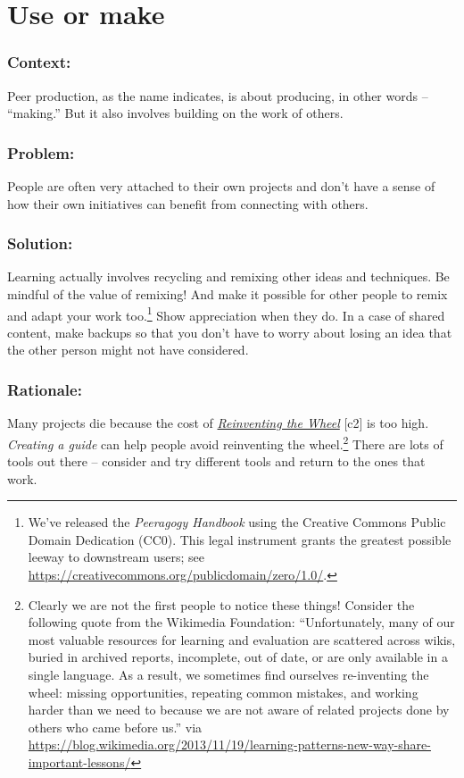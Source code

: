 \section{Use or make}
\subsubsection*{Context:}
Peer production, as the name indicates, is about producing, in other words --
``making.'' But it also involves building on the work of others.

\subsubsection*{Problem:}
People are often very attached to their own projects and don't have a sense of how their own initiatives can benefit from connecting with others.

\subsubsection*{Solution:} Learning actually involves recycling and remixing other ideas and techniques. Be mindful of the value of remixing!  And make it possible for other people to remix and adapt your work too.\footnote{We've released the \emph{Peeragogy Handbook} using the Creative Commons Public Domain Dedication (CC0).  This legal instrument grants the greatest possible leeway to downstream users; see \url{https://creativecommons.org/publicdomain/zero/1.0/}.}  Show appreciation when they do.  In a case of shared content, make backups so that you don't have to worry about losing an idea that the other person might not have considered.

\subsubsection*{Rationale:} 
Many projects die because the cost of \emph{\href{http://c2.com/cgi/wiki?ReinventingTheWheel}{Reinventing the Wheel}} [c2] is too high.  \emph{Creating a guide} can help people avoid reinventing the wheel.\footnote{Clearly we are not the first people to notice these things!  Consider the following quote from the Wikimedia Foundation: ``Unfortunately, many of our most valuable resources for learning and evaluation are scattered across wikis, buried in archived reports, incomplete, out of date, or are only available in a single language. As a result, we sometimes find ourselves re-inventing the wheel: missing opportunities, repeating common mistakes, and working harder than we need to because we are not aware of related projects done by others who came before us.'' via \url{https://blog.wikimedia.org/2013/11/19/learning-patterns-new-way-share-important-lessons/}}  There are lots of tools out there -- consider and try different tools and return to the ones that work.

